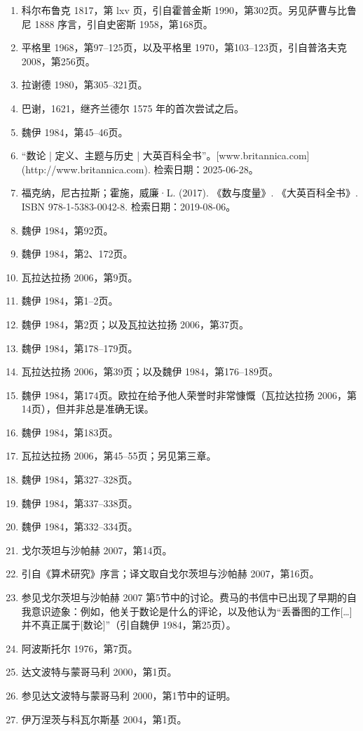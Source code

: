 \begin{enumerate}
\item 科尔布鲁克 1817，第 lxv 页，引自霍普金斯 1990，第302页。另见萨曹与比鲁尼 1888 序言，引自史密斯 1958，第168页。
\item 平格里 1968，第97–125页，以及平格里 1970，第103–123页，引自普洛夫克 2008，第256页。
\item 拉谢德 1980，第305–321页。
\item 巴谢，1621，继齐兰德尔 1575 年的首次尝试之后。
\item 魏伊 1984，第45–46页。
\item “数论 | 定义、主题与历史 | 大英百科全书”。[www.britannica.com](http://www.britannica.com). 检索日期：2025-06-28。
\item 福克纳，尼古拉斯；霍施，威廉·L. (2017). 《数与度量》. 《大英百科全书》. ISBN 978-1-5383-0042-8. 检索日期：2019-08-06。
\item 魏伊 1984，第92页。
\item 魏伊 1984，第2、172页。
\item 瓦拉达拉扬 2006，第9页。
\item 魏伊 1984，第1–2页。
\item 魏伊 1984，第2页；以及瓦拉达拉扬 2006，第37页。
\item 魏伊 1984，第178–179页。
\item 瓦拉达拉扬 2006，第39页；以及魏伊 1984，第176–189页。
\item 魏伊 1984，第174页。欧拉在给予他人荣誉时非常慷慨（瓦拉达拉扬 2006，第14页），但并非总是准确无误。
\item 魏伊 1984，第183页。
\item 瓦拉达拉扬 2006，第45–55页；另见第三章。
\item 魏伊 1984，第327–328页。
\item 魏伊 1984，第337–338页。
\item 魏伊 1984，第332–334页。
\item 戈尔茨坦与沙帕赫 2007，第14页。
\item 引自《算术研究》序言；译文取自戈尔茨坦与沙帕赫 2007，第16页。
\item 参见戈尔茨坦与沙帕赫 2007 第5节中的讨论。费马的书信中已出现了早期的自我意识迹象：例如，他关于数论是什么的评论，以及他认为“丢番图的工作[…]并不真正属于[数论]”（引自魏伊 1984，第25页）。
\item 阿波斯托尔 1976，第7页。
\item 达文波特与蒙哥马利 2000，第1页。
\item 参见达文波特与蒙哥马利 2000，第1节中的证明。
\item 伊万涅茨与科瓦尔斯基 2004，第1页。

\end{enumerate}

